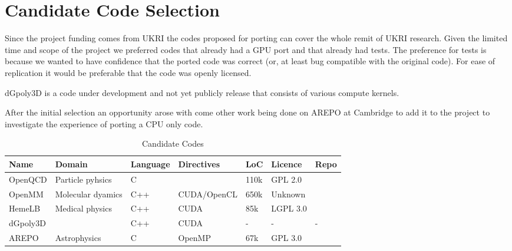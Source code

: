 \documentclass[main]{subfiles}
\begin{document}
\section{Candidate Code Selection}\label{sec:codesel}
Since the project funding comes from UKRI the codes proposed for porting can cover the whole remit of UKRI research.
Given the limited time and scope of the project we preferred codes that already had a GPU port and that already had tests.
The preference for tests is because we wanted to have confidence that the ported code was correct (or, at least bug compatible with the original code).
For ease of replication it would be preferable that the code was openly licensed.

dGpoly3D is a code under development and not yet publicly release that consists of various compute kernels.

After the initial selection an opportunity arose with come other work being done on AREPO at Cambridge to add it to the project to investigate the experience of porting a CPU only code.

\begin{table}[htb]\small
	\centering
	\begin{tabular}{lllllll}
		Name     & Domain            & Language & Directives  & LoC  & Licence  & Repo                                                \\
		\hline
		OpenQCD  & Particle pyhsics  & C        &             & 110k & GPL 2.0  & \cite{fastsum_collaboration_openqcd-fastsum_nodate} \\
		OpenMM   & Molecular dyamics & C++      & CUDA/OpenCL & 650k & Unknown  & \cite{noauthor_openmm_nodate}                       \\
		HemeLB   & Medical physics   & C++      & CUDA        & 85k  & LGPL 3.0 & \cite{hemelb_authors_hemelb_nodate}                 \\
		dGpoly3D &                   & C++      & CUDA        & -    & -        & -                                                   \\
		AREPO    & Astrophysics      & C        & OpenMP      & 67k  & GPL 3.0  & \cite{weinberger_arepo_2020}
	\end{tabular}
	\caption{Candidate Codes}
	\label{tab:candidate codes}
\end{table}
\end{document}
